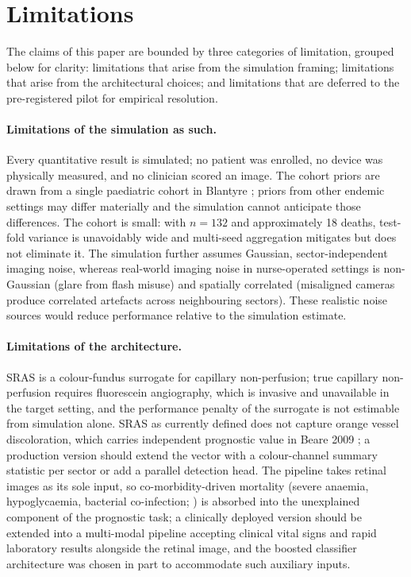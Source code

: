 \documentclass[twocolumn,10pt]{article}
\begin{document}
\section{Limitations}
\label{sec:limits}
The claims of this paper are bounded by three categories of
limitation, grouped below for clarity: limitations that arise
from the simulation framing; limitations that arise from the
architectural choices; and limitations that are deferred to the
pre-registered pilot for empirical resolution.

\paragraph{Limitations of the simulation as such.}
Every quantitative result is simulated; no patient was enrolled,
no device was physically measured, and no clinician scored an
image. The cohort priors are drawn from a single paediatric
cohort in Blantyre \cite{Beare2006,Beare2009}; priors from other
endemic settings may differ materially and the simulation cannot
anticipate those differences. The cohort is small: with $n=132$
and approximately 18 deaths, test-fold variance is unavoidably
wide and multi-seed aggregation mitigates but does not eliminate
it. The simulation further assumes Gaussian, sector-independent
imaging noise, whereas real-world imaging noise in nurse-operated
settings is non-Gaussian (glare from flash misuse) and spatially
correlated (misaligned cameras produce correlated artefacts
across neighbouring sectors). These realistic noise sources
would reduce performance relative to the simulation estimate.

\paragraph{Limitations of the architecture.}
SRAS is a colour-fundus surrogate for capillary non-perfusion;
true capillary non-perfusion requires fluorescein angiography,
which is invasive and unavailable in the target setting, and the
performance penalty of the surrogate is not estimable from
simulation alone. SRAS as currently defined does not capture
orange vessel discoloration, which carries independent prognostic
value in Beare 2009 \cite{Beare2009}; a production version should
extend the vector with a colour-channel summary statistic per
sector or add a parallel detection head. The pipeline takes
retinal images as its sole input, so co-morbidity-driven
mortality (severe anaemia, hypoglycaemia, bacterial co-infection;
\cite{Taylor2004,Idro2010}) is absorbed into the unexplained
component of the prognostic task; a clinically deployed version
should be extended into a multi-modal pipeline accepting clinical
vital signs and rapid laboratory results alongside the retinal
image, and the boosted classifier architecture was chosen in part
to accommodate such auxiliary inputs.
\end{document}
